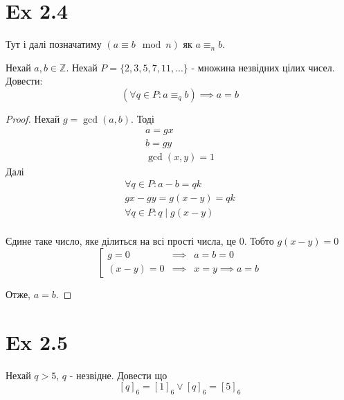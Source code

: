 \documentclass[11pt, a4paper]{article} %
\newcommand{\Z}{\mathbb{Z}}
\begin{document}
\section*{Ex 2.4}
Тут і далі позначатиму $(a\equiv b \mod n)$ як $a\equiv_n b$.

\begin{mdframed}
    Нехай $a,b\in\Z$. Нехай $P=\{2,3,5,7,11,...\}$ - множина незвідних цілих чисел.
    Довести:
    \[\left(\forall q\in P: a \equiv_q b\right) \implies a=b\]
\end{mdframed}

\begin{proof}
    Нехай $g = \gcd(a,b)$.
    Тоді 
    \begin{gather*}
        a = gx\\
        b = gy\\
        \gcd(x,y) = 1
    \end{gather*}
    Далі
    \begin{gather*}
        \forall q\in P: a-b = qk \\
        gx-gy = g(x-y) = qk \\
        \forall q\in P: q \mid g(x-y) \\
    \end{gather*}

    Єдине таке число, яке ділиться на всі прості числа, це $0$.
    Тобто $g(x-y) = 0$
    \[
    \left[\begin{matrix}
        g = 0 &\implies& a=b=0\\
        (x-y)=0 &\implies& x=y \implies a=b
    \end{matrix}\right.
    \]

    Отже, $a=b$.
\end{proof}

\section*{Ex 2.5}
\begin{mdframed}
    Нехай $q>5$, $q$ - незвідне.
    Довести що
    \[[q]_6 = [1]_6 \vee [q]_6 = [5]_6\]     
\end{mdframed}
\end{document}
